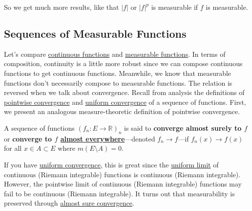   So we get much more results, like that $|f|$ or $|f|^p$ is measurable if $f$ is measurable. 

\subsection{Sequences of Measurable Functions}

  Let's compare \hyperref[pst-def:continuous_func]{continuous functions} and \hyperref[def:measurable-function]{measurable functions}. In terms of composition, continuity is a little more robust since we can compose continuous functions to get continuous functions. Meanwhile, we know that measurable functions don't necessarily compose to measurable functions. The relation is reversed when we talk about convergence. Recall from analysis the definitions of \hyperref[real-def:pointwise-convergence]{pointwise convergence} and \hyperref[real-def:uniform-convergence]{uniform convergence} of a sequence of functions. First, we present an analogous measure-theoretic definition of pointwise convergence. 

  \begin{definition}
    \label{def:almost-sure-convergence}
    A sequence of functions $(f_n: E \to \mathbb{R})_n$ is said to \textbf{converge almost surely to $f$} or \textbf{converge to $f$ \hyperref[def:almost_everywhere]{almost everywhere}}---denoted $f_n \to f$---if $f_n (x) \to f(x)$ for all $x \in A \subset E$ where $m(E \setminus A) = 0$. 
  \end{definition}

  If you have \hyperref[real-def:uniform-convergence]{uniform convergence}, this is great since the \hyperref[pst-thm:uniform-limit-theorem]{uniform limit} of continuous (Riemann integrable) functions is continuous (Riemann integrable). However, the pointwise limit of continuous (Riemann integrable) functions may fail to be continuous (Riemann integrable). It turns out that measurability is preserved through \hyperref[def:almost-sure-convergence]{almost sure convergence}. 

